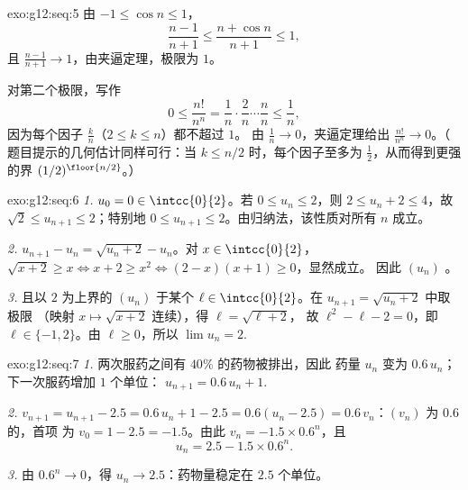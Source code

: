 \begin{solution}{exo:g12:seq:5}
由 $-1 \leq \cos n \leq 1$，
\[
\frac{n-1}{n+1} \leq \frac{n + \cos n}{n+1} \leq 1,
\]
且 $\frac{n-1}{n+1} \to 1$，由夹逼定理，极限为 $1$。

对第二个极限，写作
\[
0 \leq \frac{n!}{n^n}
= \frac{1}{n}\cdot\frac{2}{n}\cdots\frac{n}{n}
\leq \frac{1}{n},
\]
因为每个因子 $\frac{k}{n}$（$2 \leq k \leq n$）都不超过 $1$。
由 $\frac1n \to 0$，夹逼定理给出 $\frac{n!}{n^n} \to 0$。（
题目提示的几何估计同样可行：当 $k \leq n/2$ 时，每个因子至多为
$\frac12$，从而得到更强的界 $(1/2)^{\floor{n/2}}$。）
\end{solution}

\begin{solution}{exo:g12:seq:6}
\emph{1.} $u_0 = 0 \in \intcc{0}{2}$。若 $0 \leq u_n \leq 2$，则
$2 \leq u_n + 2 \leq 4$，故 $\sqrt{2} \leq u_{n+1} \leq 2$；特别地
$0 \leq u_{n+1} \leq 2$。由归纳法，该性质对所有 $n$ 成立。

\emph{2.} $u_{n+1} - u_n = \sqrt{u_n + 2} - u_n$。对 $x \in \intcc{0}{2}$，
$\sqrt{x+2} \geq x \iff x + 2 \geq x^2 \iff (2-x)(x+1) \geq 0$，显然成立。
因此 $(u_n)$ 。

\emph{3.} 且以 $2$ 为上界的 $(u_n)$ 于某个
$\ell \in \intcc{0}{2}$。在 $u_{n+1} = \sqrt{u_n + 2}$ 中取极限
（映射 $x \mapsto \sqrt{x+2}$ 连续），得 $\ell = \sqrt{\ell + 2}$，
故 $\ell^2 - \ell - 2 = 0$，即 $\ell \in \{-1, 2\}$。由 $\ell \geq 0$，所以
$\lim u_n = 2$.
\end{solution}

\begin{solution}{exo:g12:seq:7}
\emph{1.} 两次服药之间有 $40\%$ 的药物被排出，因此
药量 $u_n$ 变为 $0.6\,u_n$；下一次服药增加 $1$ 个单位：
$u_{n+1} = 0.6\,u_n + 1$.

\emph{2.} $v_{n+1} = u_{n+1} - 2.5 = 0.6\,u_n + 1 - 2.5 = 0.6(u_n - 2.5)
= 0.6\,v_n$：$(v_n)$ 为 $0.6$ 的，首项
为 $v_0 = 1 - 2.5 = -1.5$。由此 $v_n = -1.5 \times 0.6^n$，且
\[
u_n = 2.5 - 1.5 \times 0.6^n .
\]

\emph{3.} 由 $0.6^n \to 0$，得 $u_n \to 2.5$：药物量稳定在
$2.5$ 个单位。
\end{solution}


